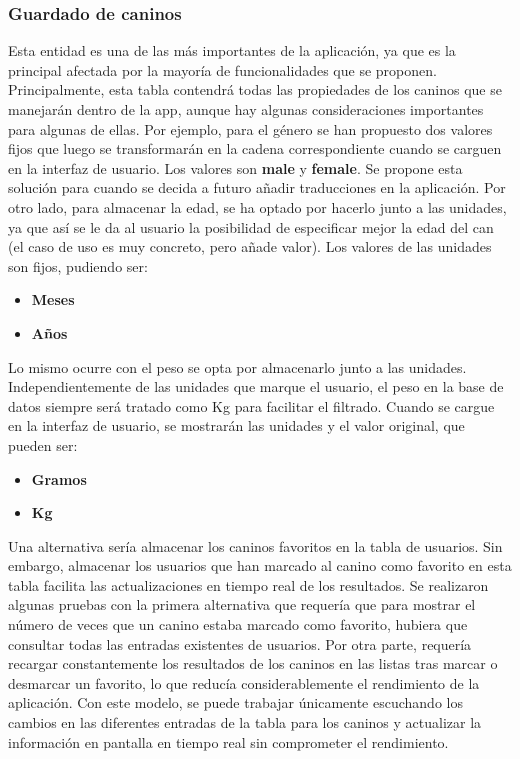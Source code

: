 \documentclass[a4paper, 12pt]{article}
\begin{document}
\subsubsection{Guardado de caninos}

Esta entidad es una de las más importantes de la aplicación, ya que es la principal afectada por la mayoría de funcionalidades que se proponen. Principalmente, esta tabla contendrá todas las propiedades de los caninos que se manejarán dentro de la app, aunque hay algunas consideraciones importantes para algunas de ellas. Por ejemplo, para el género se han propuesto dos valores fijos que luego se transformarán en la cadena correspondiente cuando se carguen en la interfaz de usuario. Los valores son \textbf{male} y \textbf{female}. Se propone esta solución para cuando se decida a futuro añadir traducciones en la aplicación. Por otro lado, para almacenar la edad, se ha optado por hacerlo junto a las unidades, ya que así se le da al usuario la posibilidad de especificar mejor la edad del can (el caso de uso es muy concreto, pero añade valor). Los valores de las unidades son fijos, pudiendo ser:

\begin{itemize}[noitemsep]
	\item \textbf{Meses}
	\item \textbf{Años}
\end{itemize}

Lo mismo ocurre con el peso se opta por almacenarlo junto a las unidades. Independientemente de las unidades que marque el usuario, el peso en la base de datos siempre será tratado como Kg para facilitar el filtrado. Cuando se cargue en la interfaz de usuario, se mostrarán las unidades y el valor original, que pueden ser:

\begin{itemize}[noitemsep]
	\item \textbf{Gramos}
	\item \textbf{Kg}
\end{itemize}

Una alternativa sería almacenar los caninos favoritos en la tabla de usuarios. Sin embargo, almacenar los usuarios que han marcado al canino como favorito en esta tabla facilita las actualizaciones en tiempo real de los resultados. Se realizaron algunas pruebas con la primera alternativa que requería que para mostrar el número de veces que un canino estaba marcado como favorito, hubiera que consultar todas las entradas existentes de usuarios. Por otra parte, requería recargar constantemente los resultados de los caninos en las listas tras marcar o desmarcar un favorito, lo que reducía considerablemente el rendimiento de la aplicación. Con este modelo, se puede trabajar únicamente escuchando los cambios en las diferentes entradas de la tabla para los caninos y actualizar la información en pantalla en tiempo real sin comprometer el rendimiento. 
\end{document}
